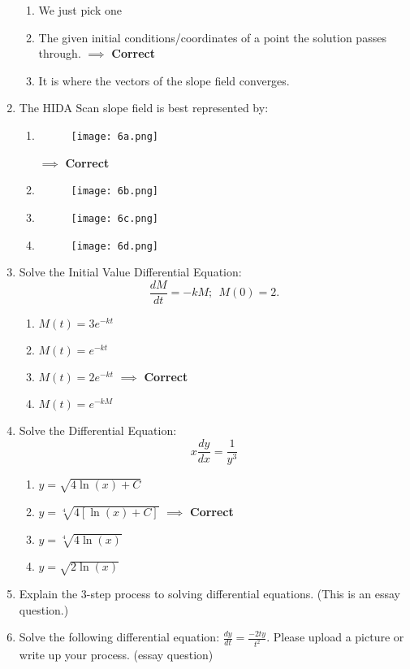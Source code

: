 \documentclass[11pt]{article}
\begin{document}
\begin{enumerate}
\begin{enumerate}
		\item We just pick one
		\item The given initial conditions/coordinates of a point the solution passes through. $\implies$ \textbf{Correct}
		\item It is where the vectors of the slope field converges. 
	\end{enumerate}
	\item The HIDA Scan slope field is best represented by:
	\begin{enumerate}
		\item \begin{wrapfigure}
		\texttt{[image: 6a.png]}
		\end{wrapfigure} $\implies$ \textbf{Correct}
		\item \begin{wrapfigure}
		\texttt{[image: 6b.png]}
		\end{wrapfigure}
		\item \begin{wrapfigure}
		\texttt{[image: 6c.png]}
		\end{wrapfigure}
		\item \begin{wrapfigure}
		\texttt{[image: 6d.png]}
		\end{wrapfigure}
	\end{enumerate}
	\item Solve the Initial Value Differential Equation: $$\frac{dM}{dt} = -kM; \:\: M(0) = 2.$$
	\begin{enumerate}
		\item $M(t) = 3e^{-kt}$
		\item $M(t) = e^{-kt}$
		\item $M(t) = 2e^{-kt}$ $\implies$ \textbf{Correct}
		\item $M(t) = e^{-kM}$
	\end{enumerate}
	\item Solve the Differential Equation: $$x\frac{dy}{dx}=\frac{1}{y^3}$$
	\begin{enumerate}
		\item $y = \sqrt{4\ln(x) + C}$ 
		\item $y = \sqrt[4]{4[\ln(x) + C]}$ $\implies$ \textbf{Correct}
		\item $y = \sqrt[4]{4\ln(x)}$
		\item $y = \sqrt{2\ln(x)}$
	\end{enumerate}
	\item Explain the 3-step process to solving differential equations. (This is an essay question.)
	\item Solve the following differential equation: $\frac{dy}{dt} = \frac{-2ty}{t^2}$. Please upload a picture or write up your process. (essay question) 
\end{enumerate}
\end{document}
